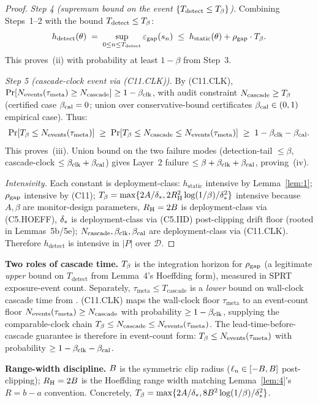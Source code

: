 \begin{proof}
\emph{Step 4 (supremum bound on the event $\{T_{\mathrm{detect}}
\leq T_{\beta}\}$).}  Combining Steps~1--2 with the bound
$T_{\mathrm{detect}} \leq T_{\beta}$:
\[
  h_{\mathrm{detect}}(\theta) \;=\;
  \sup_{0 \leq n \leq T_{\mathrm{detect}}} \varepsilon_{\mathrm{gap}}(s_n)
  \;\leq\; h_{\mathrm{static}}(\theta) + \rho_{\mathrm{gap}} \cdot
  T_{\beta}.
\]
This proves~(ii) with probability at least $1 - \beta$ from Step~3.

\emph{Step 5 (cascade-clock event via (C11.CLK)).}  By (C11.CLK),
$\Pr[N_{\mathrm{events}}(\tau_{\mathrm{meta}}) \geq N_{\mathrm{cascade}}] \geq 1 - \beta_{\mathrm{clk}}$, with
audit constraint $N_{\mathrm{cascade}} \geq T_{\beta}$ (certified case $\beta_{\mathrm{cal}} = 0$;
union over conservative-bound certificates $\beta_{\mathrm{cal}} \in (0,1)$
empirical case).  Thus:
\[
  \Pr[T_{\beta} \leq N_{\mathrm{events}}(\tau_{\mathrm{meta}})] \;\geq\;
  \Pr[T_{\beta} \leq N_{\mathrm{cascade}} \leq N_{\mathrm{events}}(\tau_{\mathrm{meta}})]
  \;\geq\; 1 - \beta_{\mathrm{clk}} - \beta_{\mathrm{cal}}.
\]
This proves~(iii).  Union bound on the two failure modes
(detection-tail $\leq \beta$, cascade-clock $\leq \beta_{\mathrm{clk}} + \beta_{\mathrm{cal}}$)
gives Layer~2 failure $\leq \beta + \beta_{\mathrm{clk}} + \beta_{\mathrm{cal}}$, proving~(iv).

\emph{Intensivity.}  Each constant is deployment-class:
$h_{\mathrm{static}}$ intensive by Lemma~\ref{lem:1};
$\rho_{\mathrm{gap}}$ intensive by (C11); $T_{\beta} = \max\{2A/
\delta_{*}, 2R_{\mathrm{H}}^2\log(1/\beta)/\delta_{*}^2\}$ intensive because
$A, \beta$ are monitor-design parameters, $R_{\mathrm{H}} = 2B$ is
deployment-class via (C5.HOEFF), $\delta_{*}$ is deployment-class
via (C5.IID) post-clipping drift floor (rooted in Lemmas~5b/5e);
$N_{\mathrm{cascade}}, \beta_{\mathrm{clk}}, \beta_{\mathrm{cal}}$ are deployment-class via (C11.CLK).
Therefore $h_{\mathrm{detect}}$ is intensive in $|P|$ over
$\mathcal{D}$.
\end{proof}

\textbf{Two roles of cascade time.}  $T_{\beta}$ is the integration
horizon for $\rho_{\mathrm{gap}}$ (a legitimate \emph{upper} bound on
$T_{\mathrm{detect}}$ from Lemma~4's Hoeffding form), measured in
SPRT exposure-event count.  Separately, $\tau_{\mathrm{meta}} \leq
T_{\mathrm{cascade}}$ is a \emph{lower} bound on wall-clock cascade
time from \citep[Phase~Redundancy]{lasser2026phase}.  (C11.CLK)
maps the wall-clock floor $\tau_{\mathrm{meta}}$ to an event-count
floor $N_{\mathrm{events}}(\tau_{\mathrm{meta}}) \geq N_{\mathrm{cascade}}$ with probability
$\geq 1 - \beta_{\mathrm{clk}}$, supplying the comparable-clock chain $T_{\beta} \leq
N_{\mathrm{cascade}} \leq N_{\mathrm{events}}(\tau_{\mathrm{meta}})$.  The lead-time-before-
cascade guarantee is therefore in event-count form: $T_{\beta} \leq
N_{\mathrm{events}}(\tau_{\mathrm{meta}})$ with probability $\geq 1 - \beta_{\mathrm{clk}} -
\beta_{\mathrm{cal}}$.

\textbf{Range-width discipline.}  $B$ is the symmetric clip
radius ($\ell_n \in [-B, B]$ post-clipping); $R_{\mathrm{H}} =
2B$ is the Hoeffding range width matching Lemma~\ref{lem:4}'s
$R = b - a$ convention.  Concretely,
$T_{\beta} = \max\{2A/\delta_{*}, 8B^2\log(1/\beta)/\delta_{*}^2\}$.

